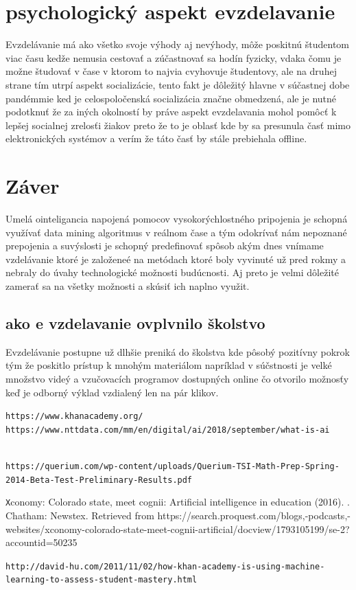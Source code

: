 \documentclass[10pt,oneside,slovak,a4paper]{article}
\begin{document}
\section{psychologický aspekt evzdelavanie }
Evzdelávanie má ako všetko svoje výhody aj nevýhody, môže poskitnú študentom viac času kedže nemusia cestovať a zúčastnovať sa hodín fyzicky, vdaka čomu je možne študovať v čase v ktorom to najvia cvyhovuje študentovy, ale na druhej strane tím utrpí aspekt socializácie, tento fakt je dôležitý hlavne v súčastnej dobe pandémmie ked je celospoločenská socializácia značne obmedzená, ale je nutné podotknuť že za iných okolností by práve aspekt evzdelavania mohol pomôcť k lepšej socialnej zrelosťi žiakov preto že to je oblasť kde by sa presunula časť mimo elektronických systémov a verím že táto časť by stále prebiehala offline.


\section{Záver}
\cite{AI} Umelá ointeligancia napojená pomocov vysokorýchlostného pripojenia je schopná využívať data mining algoritmus v reálnom čase a tým odokrívať nám nepoznané prepojenia a suvýslosti je schopný predefinovať spôsob akým dnes vnímame vzdelávanie ktoré je založeneé na metódach ktoré boly vyvinuté už pred rokmy a nebraly do úvahy technologické možnosti budúcnosti. Aj preto je velmi dôležité zamerať sa na všetky možnosti a skúsiť ich naplno využit.

\subsection{ako e vzdelavanie ovplvnilo školstvo}
Evzdelávanie postupne už dlhšie preniká do školstva kde pôsobý pozitívny pokrok tým že poskitlo prístup k mnohým materiálom napríklad v súčstnosti je velké množstvo videý a vzučovacích programov dostupných online čo otvorilo možnosťy keď je odborný výklad vzdialený len na pár klikov. \cite{10.1145/3399971.3399984}





	
\label{khanacademy} 
\texttt{https://www.khanacademy.org/}
\\
\label{AI} 
\texttt{https://www.nttdata.com/mm/en/digital/ai/2018/september/what-is-ai}
\date{22.11.2020}
\\
\label{querium_report}
\texttt{https://querium.com/wp-content/uploads/Querium-TSI-Math-Prep-Spring-2014-Beta-Test-Preliminary-Results.pdf}

\label{cognii}
\texttt Xconomy: Colorado state, meet cognii: Artificial intelligence in education (2016). . Chatham: Newstex. Retrieved from https://search.proquest.com/blogs,-podcasts,-websites/xconomy-colorado-state-meet-cognii-artificial/docview/1793105199/se-2?accountid=50235


\label{khan_academy_learning}
\texttt{http://david-hu.com/2011/11/02/how-khan-academy-is-using-machine-learning-to-assess-student-mastery.html}
	
\end{document}

